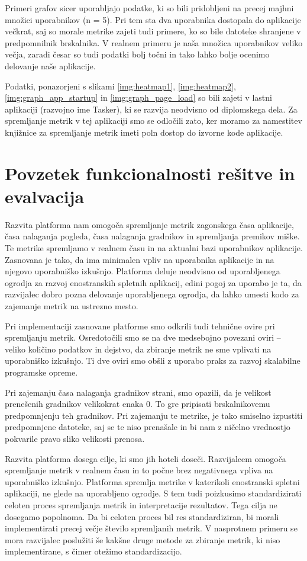 \documentclass[a4paper, 12pt]{book}
\begin{document}
Primeri grafov sicer uporabljajo podatke, ki so bili pridobljeni na precej majhni množici uporabnikov (n = 5). Pri tem sta dva uporabnika dostopala do aplikacije večkrat, saj so morale metrike zajeti tudi primere, ko so bile datoteke shranjene v predpomnilnik brskalnika. V realnem primeru je naša množica uporabnikov veliko večja, zaradi česar so tudi podatki bolj točni in tako lahko bolje ocenimo delovanje naše aplikacije.

Podatki, ponazorjeni s slikami \ref{img:heatmap1}, \ref{img:heatmap2}, \ref{img:graph_app_startup} in \ref{img:graph_page_load} so bili zajeti v lastni aplikaciji (razvojno ime Tasker), ki se razvija neodvisno od diplomskega dela. Za spremljanje metrik v tej aplikaciji smo se odločili zato, ker moramo za namestitev knjižnice za spremljanje metrik imeti poln dostop do izvorne kode aplikacije.

\section{Povzetek funkcionalnosti rešitve in evalvacija}

Razvita platforma nam omogoča spremljanje metrik zagonskega časa aplikacije, časa nalaganja pogleda, časa nalaganja gradnikov in spremljanja premikov miške. Te metrike spremljamo v realnem času in na aktualni bazi uporabnikov aplikacije. Zasnovana je tako, da ima minimalen vpliv na uporabnika aplikacije in na njegovo uporabniško izkušnjo. Platforma deluje neodvisno od uporabljenega ogrodja za razvoj enostranskih spletnih aplikacij, edini pogoj za uporabo je ta, da razvijalec dobro pozna delovanje uporabljenega ogrodja, da lahko umesti kodo za zajemanje metrik na ustrezno mesto.

Pri implementaciji zasnovane platforme smo odkrili tudi tehnične ovire pri spremljanju metrik. Osredotočili smo se na dve medsebojno povezani oviri -- veliko količino podatkov in dejstvo, da zbiranje metrik ne sme vplivati na uporabniško izkušnjo. Ti dve oviri smo obšli z uporabo praks za razvoj skalabilne programske opreme.

Pri zajemanju časa nalaganja gradnikov strani, smo opazili, da je velikost prenešenih gradnikov velikokrat enaka 0. To gre pripisati brskalnikovemu predpomnjenju teh gradnikov. Pri zajemanju te metrike, je tako smiselno izpustiti predpomnjene datoteke, saj se te niso prenašale in bi nam z ničelno vrednostjo pokvarile pravo sliko velikosti prenosa.

Razvita platforma dosega cilje, ki smo jih hoteli doseči. Razvijalcem omogoča spremljanje metrik v realnem času in to počne brez negativnega vpliva na uporabniško izkušnjo. Platforma spremlja metrike v katerikoli enostranski spletni aplikaciji, ne glede na uporabljeno ogrodje. S tem tudi poizkusimo standardizirati celoten proces spremljanja metrik in interpretacije rezultatov. Tega cilja ne dosegamo popolnoma. Da bi celoten proces bil res standardiziran, bi morali implementirati precej večje število spremljanih metrik. V nasprotnem primeru se mora razvijalec poslužiti še kakšne druge metode za zbiranje metrik, ki niso implementirane, s čimer otežimo standardizacijo.
\end{document}
